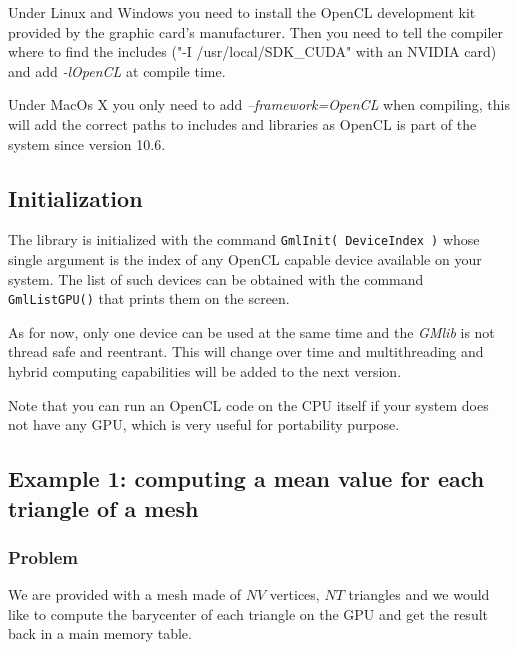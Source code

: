 \documentclass[a4paper,12pt]{article}
\begin{document}
Under Linux and Windows you need to install the OpenCL development kit provided by the graphic card's manufacturer. Then you need to tell the compiler where to find the includes ("-I /usr/local/SDK\_CUDA" with an NVIDIA card) and add \emph{-lOpenCL} at compile time.

Under MacOs X you only need to add \emph{--framework=OpenCL} when compiling, this will add the correct paths to includes and libraries as OpenCL is part of the system since version 10.6.


\subsection{Initialization}
The library is initialized with the command {\tt GmlInit( DeviceIndex )} whose single argument is the index of any OpenCL capable device available on your system. The list of such devices can be obtained with the command {\tt GmlListGPU()} that  prints them on the screen.

As for now, only one device can be used at the same time and the \emph{GMlib} is not thread safe and reentrant. This will change over time and multithreading and hybrid computing capabilities will be added to the next version.

Note that you can run an OpenCL code on the CPU itself if your system does not have any GPU, which is very useful for portability purpose.

\subsection{Example 1: computing a mean value for each triangle of a mesh}
\label{ex1}
\subsubsection{Problem}
We are provided with a mesh made of $NV$ vertices, $NT$ triangles and we would like to compute the barycenter of each triangle on the GPU and get the result back in a main memory table.
\end{document}

